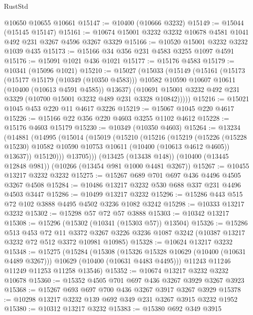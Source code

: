 \begin{lexlean}{RustStd}
\begin{coremodule}
    @10650
    @10655
    @10661
@15147 := @10400 (@10666 @3232)
@15149 := @15044 (@15145 @15147)
@15161 := @10674 @15001 @3232 @3232 @10678 @4581 @1041 @492 @231 @3267 @4596 @3267 @3329
@15166 := @10520 @15001 @3232 @3232 @1039 @435
@15173 := @15166 @34 @356 @231 @4583 @3255 @1097 @4591
@15176 := @15091 @1021 @436 @1021
@15177 := @15176 @4583
@15179 := @10341 (@15096 @1021)
@15210 := @15027
    (@15033
      (@15149
        (@15161
          (@15173
            (@15177 @15179 (@10349 (@10350 @4583)))
            @10582
            @10590
            @10607
            @10611
            (@10400 (@10613 @4591 @4585))
            @13637)
          (@10691 @15001 @3232 @492 @231 @3329 (@10700 @15001 @3232 @489 @231 @3328 @10842)))))
@15216 := @15021 @1045 @453 @220 @11 @4617 @3226
@15219 := @15067 @1045 @220 @4617
@15226 := @15166 @22 @356 @220 @4603 @3255 @1102 @4612
@15228 := @15176 @4603 @15179
@15230 := @10349 (@10350 @4603)
@15264 := @13234
    (@14881
      (@14995
        (@15014
          (@15019
            (@15210
              (@15216
                (@15219
                  (@15226
                    (@15228 @15230)
                    @10582
                    @10590
                    @10753
                    @10611
                    (@10400 (@10613 @4612 @4605))
                    @13637))
                @15120)))
          @13705)))
    (@13425 (@13438 @148))
    (@10400 (@13445 @12848 @981))
    (@10266 (@13454 @981 @1000 @4481 @3267))
@15267 := @10455 @13217 @3232 @3232
@15275 := @15267 @689 @701 @697 @436 @4496 @4505 @3267 @4508
@15284 := @10486 @13217 @3232 @530 @688 @337 @231 @4496 @4503 @3447
@15286 := @10499 @13217 @3232
@15296 := @15286 @443 @515 @72 @102 @3888 @4495 @4502 @3236 @1082 @3242
@15298 := @10333 @13217 @3232
@15302 := @15298 @57 @72 @57 @3888
@15303 := @10342 @13217
@15308 := @15296 (@15302 (@10341 (@15303 @57)) @13504)
@15326 := @15286
    @513
    @453
    @72
    @11
    @3372
    @3267
    @3226
    @3236
    @1087
    @3242
    (@10387 @13217 @3232 @72 @512 @3372 @10981 @10985)
@15328 := @10624 @13217 @3232
@15348 := @15275
    (@15284
      (@15308
        (@15326 @15328 @10629 (@10400 (@10631 @4489 @3267)))
        @10629
        (@10400 (@10631 @4483 @4495)))
      @11243
      @11246
      @11249
      @11253
      @11258
      @13546)
@15352 := @10674 @13217 @3232 @3232 @10678
@15360 := @15352 @4505 @701 @697 @436 @3267 @3929 @3267 @3923
@15368 := @15267 @693 @697 @700 @436 @3267 @3917 @3267 @3929
@15378 := @10298 @13217 @3232 @139 @692 @349 @231 @3267 @3915 @3232 @1952
@15380 := @10312 @13217 @3232
@15383 := @15380 @692 @349 @3915

\end{coremodule}
\end{lexlean}
